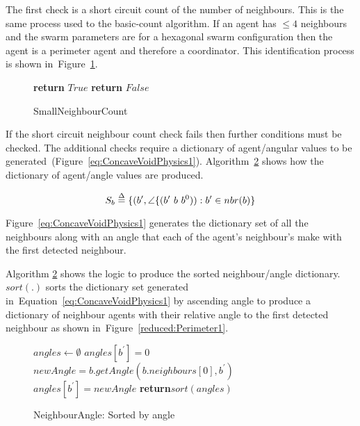 \documentclass{ieeeaccess}
\begin{document}
The first check is a short circuit count of the number of neighbours. This is the same process used to the basic-count algorithm. If an agent has $\leq 4$ neighbours and the swarm parameters are for a hexagonal swarm configuration then the agent is a perimeter agent and therefore a coordinator. This identification process is shown in~Figure~\ref{SmallNeighbourCount}. 

\begin{figure}
\begin{algorithmic}[1]
   \State\textbf{return} $True$
\EndIf
\State\textbf{return} $False$
\EndProcedure
\end{algorithmic}
\caption{SmallNeighbourCount}
\label{SmallNeighbourCount}
\end{figure}

If the short circuit neighbour count check fails then further conditions must be checked. The additional checks require a dictionary of agent/angular values to be generated~(Figure~\ref{eq:ConcaveVoidPhysics1}). Algorithm~\ref{algo:getNeighbourAngles} shows how the dictionary of agent/angle values are produced.   

\begin{center}
\begin{equation}
\label{eq:ConcaveVoidPhysics1}
S_b \buildrel \Delta \over = \{(b',\angle\{(b'~b~b^0)) : b' \in nbr(b)\}
\end{equation}
\end{center}

Figure~\ref{eq:ConcaveVoidPhysics1} generates the dictionary set of all the neighbours along with an angle that each of the agent's neighbour's make with the first detected neighbour.

Algorithm \ref{algo:getNeighbourAngles} shows the logic to produce the sorted neighbour/angle dictionary. $sort(.)$ sorts the dictionary set generated in~Equation~\ref{eq:ConcaveVoidPhysics1} by ascending angle to produce a dictionary of neighbour agents with their relative angle to the first detected neighbour as shown in~Figure~\ref{reduced:Perimeter1}.

\begin{figure}
\begin{algorithmic}[1]
\State $angles \leftarrow \emptyset$
      \State $angles[b^{'}] = 0$
	\Else
		\State $newAngle = b.getAngle(b.neighbours[0], b^{'})$
	   \State $angles[b^{'}] = newAngle$
	\EndIf
\EndFor
\State \textbf{return}{$sort(angles)$} 
\EndProcedure
\end{algorithmic}
\caption{NeighbourAngle: Sorted by angle}
\label{algo:getNeighbourAngles}
\end{figure}
\end{document}
